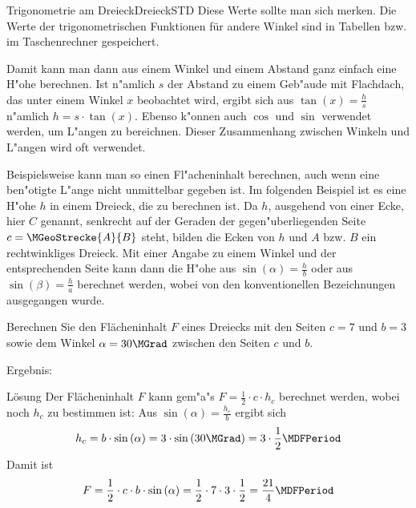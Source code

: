 \begin{MXContent}{Trigonometrie am Dreieck}{Dreieck}{STD}
Diese Werte sollte man sich merken. Die Werte der trigonometrischen Funktionen 
f\"ur andere Winkel sind in Tabellen bzw. im Taschenrechner gespeichert.

Damit kann man dann aus einem Winkel und einem Abstand ganz einfach eine H"ohe 
berechnen. 
Ist n"amlich $s$ der Abstand zu einem Geb"aude mit Flachdach, das unter einem 
Winkel $x$ beobachtet wird, ergibt sich aus $\tan(x) = \frac{h}{s}$ n"amlich 
$h = s \cdot \tan(x)$. Ebenso k"onnen auch $\cos$ und $\sin$ verwendet werden, 
um L"angen zu bereichnen. Dieser Zusammenhang zwischen Winkeln und L"angen wird
oft verwendet.

Beispielsweise kann man so einen Fl"acheninhalt berechnen, auch wenn eine 
ben"otigte L"ange nicht unmittelbar gegeben ist. Im folgenden Beispiel ist es 
eine H"ohe $h$ in einem Dreieck, die zu berechnen ist.
Da $h$, ausgehend von einer Ecke, hier $C$ genannt, senkrecht auf der Geraden 
der gegen"uberliegenden Seite $c = \MGeoStrecke{A}{B}$ steht, bilden 
die Ecken von $h$ und $A$ bzw. $B$ ein rechtwinkliges Dreieck.
Mit einer Angabe zu einem Winkel und der entsprechenden Seite kann 
dann die H"ohe aus $\sin(\alpha) = \frac{h}{b}$ oder aus 
$\sin(\beta) = \frac{h}{a}$ berechnet werden, wobei von den konventionellen
Bezeichnungen ausgegangen wurde.

\begin{MExercise}
Berechnen Sie den Fl\"acheninhalt $F$ eines Dreiecks mit den Seiten $c = 7$ 
und $b = 3$ sowie dem Winkel $\alpha = 30\MGrad$ zwischen den Seiten $c$ und $b$.

Ergebnis: %

\begin{MHint}{L\"osung}
Der Fl\"acheninhalt $F$ kann gem"a"s $F =\frac{1}{2}\cdot c \cdot h_c$ 
berechnet werden, wobei noch $h_c$ zu bestimmen ist:
Aus $\sin\left(\alpha\right)=\frac{h_c}{b}$
ergibt sich
\[
 h_c=b\cdot\sin\left(\alpha\right) %
  = 3\cdot\sin\left(30\MGrad\right) %
  = 3\cdot\frac{1}{2} \MDFPeriod %
\]
Damit ist
\[ 
F =\frac{1}{2}\cdot c\cdot b\cdot\sin\left(\alpha\right) %
  =\frac{1}{2}\cdot 7 \cdot3\cdot\frac{1}{2}=\frac{21}{4} \MDFPeriod %
\]
\end{MHint}
\end{MExercise}

\end{MXContent}


